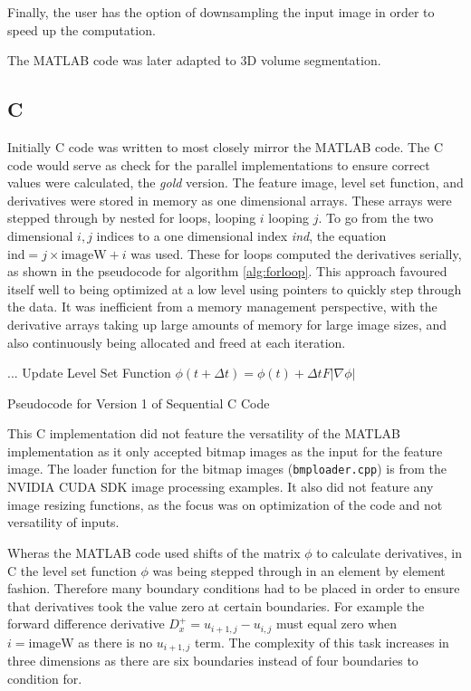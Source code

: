 Finally, the user has the option of downsampling the input image in order to speed up the computation.

The MATLAB code was later adapted to 3D volume segmentation.

	\subsection{C}
Initially C code was written to most closely mirror the MATLAB code. The C code would serve as check for the parallel implementations to ensure correct values were calculated, the \textit{gold} version. The feature image, level set function, and derivatives were stored in memory as one dimensional arrays. These arrays were stepped through by nested for loops, looping $i$ looping $j$. To go from the two dimensional $i,j$ indices to a one dimensional index \textit{ind}, the equation $\textrm{ind} = j \times \textrm{imageW} +i$ was used. These for loops computed the derivatives serially, as shown in the pseudocode for algorithm \ref{alg:forloop}. This approach favoured itself well to being optimized at a low level using pointers to quickly step through the data. It was inefficient from a memory management perspective, with the derivative arrays taking up large amounts of memory for large image sizes, and also continuously being allocated and freed at each iteration.

\begin{algorithm}[h]
\BlankLine
\dontprintsemicolon
{}
\BlankLine
...\;
\BlankLine
Update Level Set Function $\phi(t+\Delta t) =\phi(t) + \Delta t F|\nabla\phi|$\;
\caption{Pseudocode for Version 1 of Sequential C Code}\label{alg:forloop}
\end{algorithm}

This C implementation did not feature the versatility of the MATLAB implementation as it only accepted bitmap images as the input for the feature image. The loader function for the bitmap images (\texttt{bmploader.cpp}) is from the NVIDIA CUDA SDK image processing examples. It also did not feature any image resizing functions, as the focus was on optimization of the code and not versatility of inputs.

Wheras the MATLAB code used shifts of the matrix $\phi$ to calculate derivatives, in C the level set function $\phi$ was being stepped through in an element by element fashion. Therefore many boundary conditions had to be placed in order to ensure that derivatives took the value zero at certain boundaries. For example the forward difference derivative $D_x^+ =u_{i+1,j}-u_{i,j}$ must equal zero when $i=\textrm{imageW}$ as there is no $u_{i+1,j}$ term. The complexity of this task increases in three dimensions as there are six boundaries instead of four boundaries to condition for.

